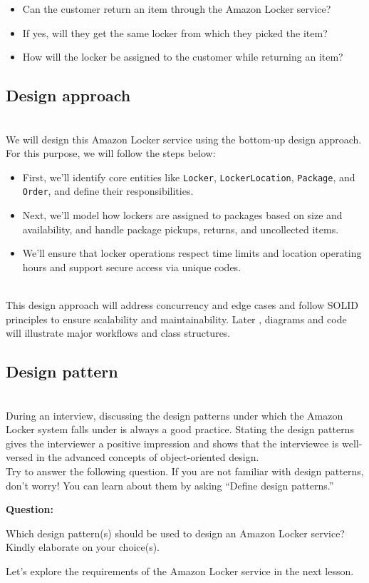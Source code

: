 \begin{itemize}
\item
\protect{}\label{6kZPLOJlSsRQeNEcaNqYb}
Can the customer return an item through the Amazon Locker service?
\item
\protect{}\label{IT015xIOv3sTyuVwGnFgX}
If yes, will they get the same locker from which they picked the item?
\item
\protect{}\label{uaNecPaf6gWeATRM6shap}
How will the locker be assigned to the customer while returning an item?
\end{itemize}

\subsection{Design approach}\label{GBiPcFE-kg589jli7jhKf}
\\
We will design this Amazon Locker service using the bottom-up design approach. For this purpose, we will follow the steps below:

\begin{itemize}
\item
\protect{}\label{om5UK9I0GvZvIU3ZD-S7L}
First, we'll identify core entities like \texttt{Locker}, \texttt{LockerLocation}, \texttt{Package}, and \texttt{Order}, and define their responsibilities.
\item
\protect{}\label{vcLUWqL_4jnuwQgvRxdb9}
Next, we'll model how lockers are assigned to packages based on size and availability, and handle package pickups, returns, and uncollected items.
\item
\protect{}\label{XWYNnxjak2cyO3XwDLaSN}
We'll ensure that locker operations respect time limits and location operating hours and support secure access via unique codes.
\end{itemize}
\\
This design approach will address concurrency and edge cases and follow SOLID principles to ensure scalability and maintainability. Later , diagrams and code will illustrate major workflows and class structures.

\subsection{Design pattern~}\label{sMziTama7-nHQurh5LN7C}
\\
During an interview, discussing the design patterns under which the Amazon Locker system falls under is always a good practice. Stating the design patterns gives the interviewer a positive impression and shows that the interviewee is well-versed in the advanced concepts of object-oriented design.
\\
Try to answer the following question. If you are not familiar with design patterns, don't worry! You can learn about them by asking ``Define design patterns.''

\textbf{Question:}

Which design pattern(s) should be used to design an Amazon Locker service? Kindly elaborate on your choice(s).

Let's explore the requirements of the Amazon Locker service in the next lesson.

